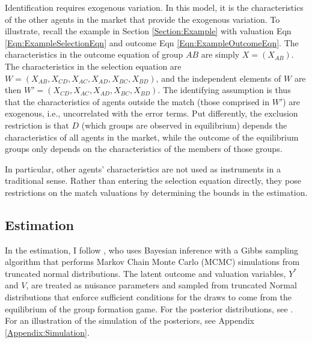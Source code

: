 Identification requires exogenous variation. In this model, it is the characteristics of the other agents in the market that provide the exogenous variation. To illustrate, recall the example in Section \ref{Section:Example} with valuation Eqn \ref{Eqn:ExampleSelectionEqn} and outcome Eqn \ref{Eqn:ExampleOutcomeEqn}. The characteristics in the outcome equation of group $AB$ are simply $X=(X_{AB})$. The characteristics in the selection equation are $W=(X_{AB}, X_{CD}, X_{AC}, X_{AD}, X_{BC}, X_{BD})$, and the independent elements of $W$ are then $W'=(X_{CD}, X_{AC}, X_{AD}, X_{BC}, X_{BD})$. The identifying assumption is thus that the characteristics of agents outside the match (those comprised in $W'$) are exogenous, i.e., uncorrelated with the error terms. Put differently, the exclusion restriction is that $D$ (which groups are observed in equilibrium) depends the characteristics of all agents in the market, while the outcome of the equilibrium groups only depends on the characteristics of the members of those groups.

In particular, other agents' characteristics are not used as instruments in a traditional sense. Rather than entering the selection equation directly, they pose restrictions on the match valuations by determining the bounds in the estimation.


\subsection{Estimation}

In the estimation, I follow \citet{Sorensen2007}, who uses Bayesian inference with a Gibbs sampling algorithm that performs Markov Chain Monte Carlo (MCMC) simulations from truncated normal distributions. The latent outcome and valuation variables, $Y^*$ and $V$, are treated as nuisance parameters  and sampled from truncated Normal distributions that enforce sufficient conditions for the draws to come from the equilibrium of the group formation game.  %
For the posterior distributions, see \citet{Klein2015a}. For an illustration of the simulation of the posteriors, see Appendix \ref{Appendix:Simulation}.

